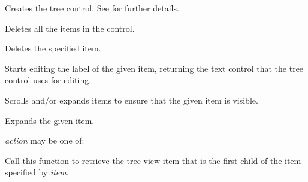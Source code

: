 Creates the tree control. See  for further details.

\label{wxtreectrldeleteallitems}


Deletes all the items in the control.

\label{wxtreectrldeleteitem}


Deletes the specified item.

\label{wxtreectrledit}


Starts editing the label of the given item, returning the text control that the tree control uses for editing.

\label{wxtreectrlensurevisible}


Scrolls and/or expands items to ensure that the given item is visible.

\label{wxtreectrlexpanditem}


Expands the given item.

{\it action} may be one of:

\twocolwidtha{5cm}
\begin{twocollist}\itemsep=0pt
\end{twocollist}

\label{wxtreectrlgetchild}


Call this function to retrieve the tree view item that is the first child of the item specified by {\it item}.

\label{wxtreectrlgetcount}

